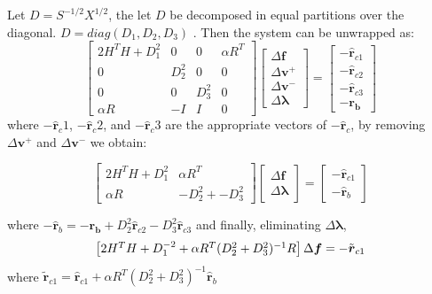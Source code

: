 \documentclass[12pt,a4paper,twoside]{report}
\begin{document}
{Let $D = S^{-1/2}X^{1/2}$, the let $D$ be decomposed in equal partitions over the diagonal. $D = diag(D_1, D_2, D_3)$ .
Then the system can be unwrapped as:
\begin{equation}
\begin{bmatrix}
2H^TH+D_1^{2} & 0 & 0 &\alpha R ^T\\
0 & D_2^{2} & 0 & 0 \\
 0 & 0 &  D_3^{2} & 0\\
\alpha R &-I & I & 0  
\end{bmatrix} 
\begin{bmatrix}
\Delta\boldsymbol{f} \\ 
\Delta\boldsymbol{v}^+ \\ 
\Delta\boldsymbol{v}^- \\ 
\Delta\boldsymbol{\lambda} 
\end{bmatrix} =
\begin{bmatrix}
-\hat{\boldsymbol{r}}_{c1} \\
-\hat{\boldsymbol{r}}_{c2} \\
-\hat{\boldsymbol{r}}_{c3} \\
 \boldsymbol{-r_b} 
\end{bmatrix}
\end{equation}
where $-\hat{\boldsymbol{r}}_c1$, $-\hat{\boldsymbol{r}}_c2$,  and $-\hat{\boldsymbol{r}}_c3$ are the appropriate vectors of $-\hat{\boldsymbol{r}}_c$, 
by removing $\Delta \boldsymbol{v}^+$ and $\Delta \boldsymbol{v}^-$ we obtain:

\begin{equation}
\begin{bmatrix}
2H^TH+D_1^{2} &\alpha R ^T\\
 \alpha R & -D_2^{2} + -D_3^{2} 
\end{bmatrix} 
\begin{bmatrix}
\Delta\boldsymbol{f} \\ 
\Delta\boldsymbol{\lambda} 
\end{bmatrix} =
\begin{bmatrix}
-\hat{\boldsymbol{r}}_{c1} \\
-\hat{\boldsymbol{r}}_b  
\end{bmatrix}
\end{equation}

 where 
 $-\hat{\boldsymbol{r}}_b =  \boldsymbol{-r_b} + D^2_2\hat{\boldsymbol{r}}_{c2} - D^2_3\hat{\boldsymbol{r}}_{c3}$
 and finally, eliminating $\Delta\boldsymbol{\lambda}$,
 \begin{equation} \label{lmnXeq}
 \begin{bmatrix}
 2H^TH+D_1^{-2} + \alpha R ^T( D_2^{2} +  D_3^{2} )^{-1}R
 \end{bmatrix} 
 \Delta\boldsymbol{f}  =
 -\tilde{\boldsymbol{r}}_{c1} \\
 \end{equation}
 where $\tilde{\boldsymbol{r}}_{c1} = \hat{\boldsymbol{r}}_{c1} + \alpha R ^T( D_2^{2} +  D_3^{2} )^{-1} \hat{\boldsymbol{r}}_{b}$
 
}
\end{document}
